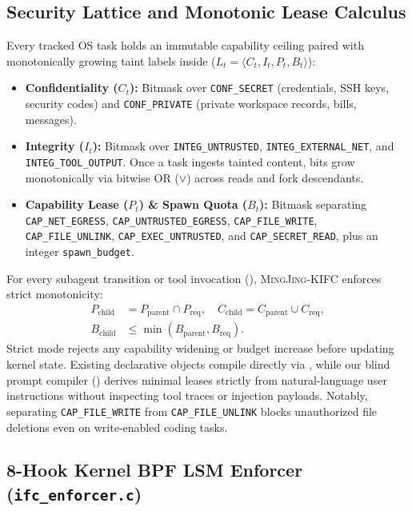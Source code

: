 \documentclass[10pt,twocolumn,letterpaper]{article}
\newcommand{\sys}{\textsc{MingJing-KIFC}}
\newcommand{\code}[1]{\texttt{\small #1}}
\begin{document}
\subsection{Security Lattice and Monotonic Lease Calculus}
Every tracked OS task holds an immutable capability ceiling paired with monotonically growing taint labels inside  ($L_t = \langle C_t, I_t, P_t, B_t \rangle$):
\begin{itemize}
  \item \textbf{Confidentiality ($C_t$):} Bitmask over \code{CONF\_SECRET} (credentials, SSH keys, security codes) and \code{CONF\_PRIVATE} (private workspace records, bills, messages).
  \item \textbf{Integrity ($I_t$):} Bitmask over \code{INTEG\_UNTRUSTED}, \code{INTEG\_EXTERNAL\_NET}, and \code{INTEG\_TOOL\_OUTPUT}. Once a task ingests tainted content, bits grow monotonically via bitwise OR ($\vee$) across reads and fork descendants.
  \item \textbf{Capability Lease ($P_t$) \& Spawn Quota ($B_t$):} Bitmask separating \code{CAP\_NET\_EGRESS}, \code{CAP\_UNTRUSTED\_EGRESS}, \code{CAP\_FILE\_WRITE}, \code{CAP\_FILE\_UNLINK}, \code{CAP\_EXEC\_UNTRUSTED}, and \code{CAP\_SECRET\_READ}, plus an integer \code{spawn\_budget}.
\end{itemize}

For every subagent transition or tool invocation (), \sys{} enforces strict monotonicity:
\begin{equation}
\begin{aligned}
P_{\text{child}} &= P_{\text{parent}} \cap P_{\text{req}}, \quad
C_{\text{child}} = C_{\text{parent}} \cup C_{\text{req}}, \\
B_{\text{child}} &\le \min(B_{\text{parent}}, B_{\text{req}}).
\end{aligned}
\end{equation}
Strict mode rejects any capability widening or budget increase before updating kernel state. Existing declarative  objects compile directly via , while our blind prompt compiler () derives minimal leases strictly from natural-language user instructions without inspecting tool traces or injection payloads. Notably, separating \code{CAP\_FILE\_WRITE} from \code{CAP\_FILE\_UNLINK} blocks unauthorized file deletions even on write-enabled coding tasks.

\subsection{8-Hook Kernel BPF LSM Enforcer (\code{ifc\_enforcer.c})}
\label{sec:lsm}
\end{document}
